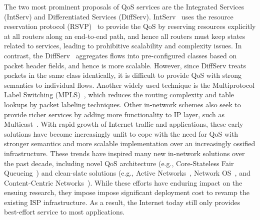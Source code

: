 The two most prominent proposals of QoS services are
the Integrated Services (IntServ) and Differentiated Services (DiffServ). 
IntServ~\cite{intserv} uses the resource
reservation protocol (RSVP)~\cite{rsvp} to provide the
QoS by reserving resources explicitly at all routers along an end-to-end 
path, and hence all routers must keep states related to services,
leading to prohibitive scalability and complexity issues.
In contrast, the DiffServ~\cite{diffserv}
aggregates flows into pre-configured classes based on packet header 
fields, and hence is  more scalable. However, since DiffServ treats 
packets in the same class identically, it is difficult to provide QoS with
strong semantics to individual flows.
Another widely used technique is the Multiprotocol Label Switching 
(MPLS)~\cite{mpls}, which reduces 
the routing complexity and table lookups by packet labeling techniques.
Other in-network schemes also seek to provide richer services by adding
more functionality to IP layer, such as Multicast~\cite{mbone}.
With rapid growth of Internet traffic and applications, 
these early solutions have become increasingly unfit to cope
with the need for QoS with stronger semantics and 
more scalable implementation over 
an increasingly ossified infrastructure.
These trends have inspired many new in-network solutions 
over the past decade, including
novel QoS architecture (e.g., 
Core-Stateless Fair Queueing~\cite{csfq})
and clean-slate solutions (e.g.,
Active Networks~\cite{active-network}, 
Network OS~\cite{nox}, and 
Content-Centric Networks~\cite{ccn}).
While these efforts have enduring impact on the ensuing research,
they impose  impose significant deployment cost to revamp the existing ISP
infrastructure.
As a result, the Internet today still only provides best-effort
service to most applications.

